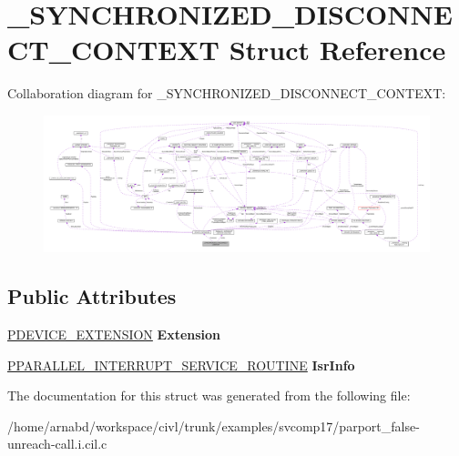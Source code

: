 \hypertarget{struct__SYNCHRONIZED__DISCONNECT__CONTEXT}{}\section{\+\_\+\+S\+Y\+N\+C\+H\+R\+O\+N\+I\+Z\+E\+D\+\_\+\+D\+I\+S\+C\+O\+N\+N\+E\+C\+T\+\_\+\+C\+O\+N\+T\+E\+X\+T Struct Reference}
\label{struct__SYNCHRONIZED__DISCONNECT__CONTEXT}


Collaboration diagram for \+\_\+\+S\+Y\+N\+C\+H\+R\+O\+N\+I\+Z\+E\+D\+\_\+\+D\+I\+S\+C\+O\+N\+N\+E\+C\+T\+\_\+\+C\+O\+N\+T\+E\+X\+T\+:
\nopagebreak
\begin{figure}[H]
\begin{center}
\leavevmode
\includegraphics[width=350pt]{struct__SYNCHRONIZED__DISCONNECT__CONTEXT__coll__graph}
\end{center}
\end{figure}
\subsection*{Public Attributes}
\begin{DoxyCompactItemize}
\item 
\hypertarget{struct__SYNCHRONIZED__DISCONNECT__CONTEXT_a9b9a4c122c794b6ef9b80c633a53a131}{}\hyperlink{struct__DEVICE__EXTENSION}{P\+D\+E\+V\+I\+C\+E\+\_\+\+E\+X\+T\+E\+N\+S\+I\+O\+N} {\bfseries Extension}\label{struct__SYNCHRONIZED__DISCONNECT__CONTEXT_a9b9a4c122c794b6ef9b80c633a53a131}

\item 
\hypertarget{struct__SYNCHRONIZED__DISCONNECT__CONTEXT_a47c377ef28857a4c2f5f7def7d5ef357}{}\hyperlink{struct__PARALLEL__INTERRUPT__SERVICE__ROUTINE}{P\+P\+A\+R\+A\+L\+L\+E\+L\+\_\+\+I\+N\+T\+E\+R\+R\+U\+P\+T\+\_\+\+S\+E\+R\+V\+I\+C\+E\+\_\+\+R\+O\+U\+T\+I\+N\+E} {\bfseries Isr\+Info}\label{struct__SYNCHRONIZED__DISCONNECT__CONTEXT_a47c377ef28857a4c2f5f7def7d5ef357}

\end{DoxyCompactItemize}


The documentation for this struct was generated from the following file\+:\begin{DoxyCompactItemize}
\item 
/home/arnabd/workspace/civl/trunk/examples/svcomp17/parport\+\_\+false-\/unreach-\/call.\+i.\+cil.\+c\end{DoxyCompactItemize}
